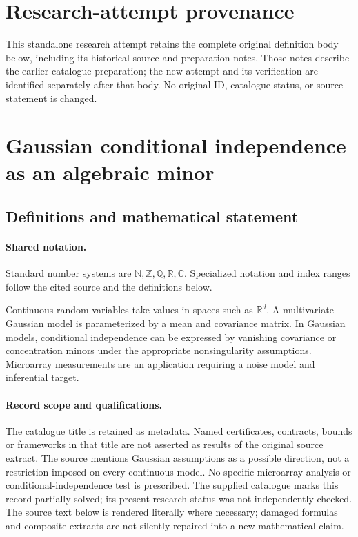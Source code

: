 \documentclass[11pt]{article}
\begin{document}
\section*{Research-attempt provenance}
This standalone research attempt retains the complete original definition body below,
including its historical source and preparation notes. Those notes describe the
earlier catalogue preparation; the new attempt and its verification are identified
separately after that body. No original ID, catalogue status, or source statement is changed.

\section{Gaussian conditional independence as an algebraic minor}\label{statement}

\subsection{Definitions and mathematical statement}

\paragraph{Shared notation.}Standard number systems are $\mathbb N,\mathbb Z,\mathbb Q,\mathbb R,\mathbb C$. Specialized notation and index ranges follow the cited source and the definitions below.


Continuous random variables take values in spaces such as $\mathbb R^d$. A multivariate Gaussian model is parameterized by a mean and covariance matrix. In Gaussian models, conditional independence can be expressed by vanishing covariance or concentration minors under the appropriate nonsingularity assumptions. Microarray measurements are an application requiring a noise model and inferential target.
\paragraph{Record scope and qualifications.}
The catalogue title is retained as metadata. Named certificates, contracts, bounds or frameworks in that title are not asserted as results of the original source extract.
The source mentions Gaussian assumptions as a possible direction, not a restriction imposed on every continuous model. No specific microarray analysis or conditional-independence test is prescribed. The supplied catalogue marks this record partially solved; its present research status was not independently checked.
The source text below is rendered literally where necessary; damaged formulas and composite extracts are not silently repaired into a new mathematical claim.
\end{document}
